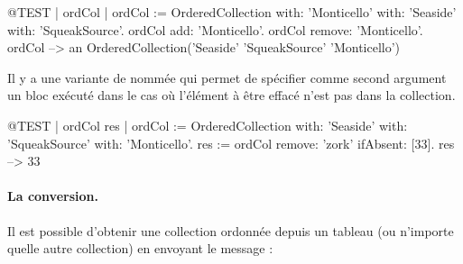 \documentclass[a4paper,10pt,twoside]{book}
\begin{document}
\begin{code}{@TEST | ordCol | ordCol := OrderedCollection with: 'Monticello' with: 'Seaside' with: 'SqueakSource'.}
ordCol add: 'Monticello'.
ordCol remove: 'Monticello'.
ordCol --> an OrderedCollection('Seaside' 'SqueakSource' 'Monticello')
\end{code}

Il y a une variante de  nomm\'ee  qui permet de sp\'ecifier comme second argument un bloc ex\'ecut\'e dans le cas o\`u l'\'el\'ement \`a \^etre effac\'e n'est pas dans la collection. 

\begin{code}{@TEST | ordCol res | ordCol := OrderedCollection with: 'Seaside' with: 'SqueakSource' with: 'Monticello'.}
res := ordCol remove: 'zork' ifAbsent: [33].
res --> 33
\end{code}

\paragraph{La conversion.}
Il est possible d'obtenir une collection ordonn\'ee  depuis
un tableau  (ou n'importe quelle autre collection) en envoyant le message :




\end{document}
